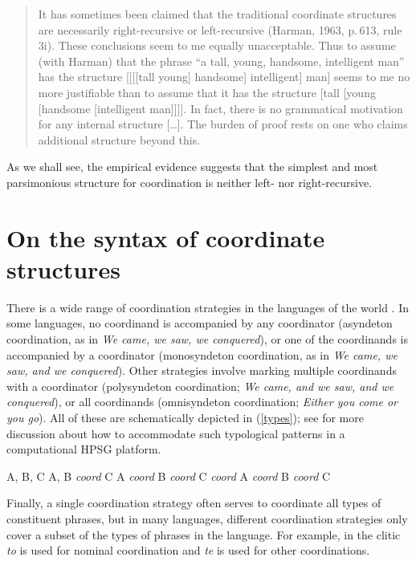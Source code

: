 \begin{quote}
It has sometimes been claimed that the traditional coordinate structures are necessarily
right-recursive \citep{Yngve60a-u} or left-recursive (Harman, 1963, p.\,613, rule 3i). These
conclusions seem to me equally unacceptable. Thus to assume (with Harman) that the phrase ``a tall,
young, handsome, intelligent man'' has the structure [[[[tall young] handsome] intelligent] man]
seems to me no more justifiable than to assume that it has the structure [tall [young [handsome
[intelligent man]]]]. In fact, there is no grammatical motivation for any internal structure
[\ldots]. The burden of proof rests on one who claims additional structure beyond
this. \citep[196--197]{chom65} 
\end{quote}

\noindent
As we shall see, the empirical evidence suggests that
the simplest and most parsimonious structure for coordination is neither left- nor right-recursive.


\section{On the syntax of coordinate structures}


There is a wide range of coordination strategies in the languages of the world \citep{haspelmath}. In some languages, no coordinand is accompanied by any coordinator (asyndeton coordination, as in \emph{We came, we saw, we conquered}), or one of the coordinands is accompanied by a coordinator (monosyndeton coordination,  as in \emph{We came, we saw, and we conquered}). Other strategies involve marking multiple coordinands with a coordinator (polysyndeton coordination;
\emph{We came, and we saw, and we conquered}), or all coordinands (omnisyndeton coordination;
\emph{Either you come or you go}).
All of these are schematically depicted in (\ref{types}); see
 \citet{Drellishak:Bender:05} for more discussion about how to accommodate such typological patterns in a computational HPSG platform.

\eal
\label{types}
\label{ex-coordination-types}
\settowidth{}
\ex A, B, C                                      
\ex A, B \emph{coord} C                          
\ex A \emph{coord} B \emph{coord} C              
\ex \emph{coord} A \emph{coord} B \emph{coord} C 
\zl


\noindent
 Finally, a single coordination strategy often serves to coordinate all types of constituent phrases, but in many languages, different coordination strategies only cover a subset of the types of phrases in the language. For example, in
 the clitic \emph{to} is used for nominal coordination
and \emph{te} is used for other coordinations.

